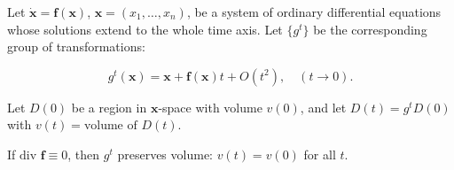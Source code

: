 Let $\dot{\mathbf{x}} = \mathbf{f}(\mathbf{x})$, $\mathbf{x} = (x_1, \ldots, x_n)$, be a system of ordinary differential equations whose solutions extend to the whole time axis. Let $\{g^t\}$ be the corresponding group of transformations:

$$g^t(\mathbf{x}) = \mathbf{x} + \mathbf{f}(\mathbf{x})t + O(t^2), \quad (t \to 0).$$

Let $D(0)$ be a region in $\mathbf{x}$-space with volume $v(0)$, and let $D(t) = g^t D(0)$ with $v(t) = \text{volume of } D(t)$.

If $\text{div } \mathbf{f} \equiv 0$, then $g^t$ preserves volume: $v(t) = v(0)$ for all $t$.
